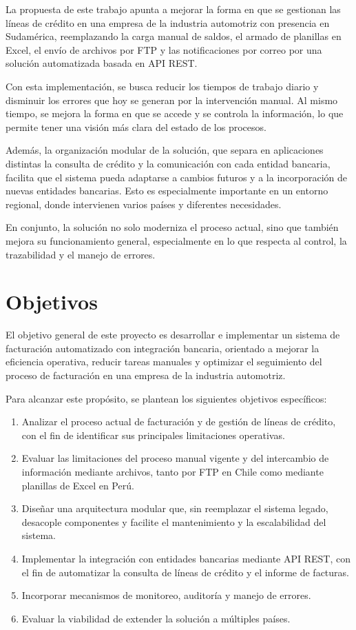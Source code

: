 La propuesta de este trabajo apunta a mejorar la forma en que se gestionan las líneas de crédito en una empresa de la industria automotriz con presencia en Sudamérica, reemplazando la carga manual de saldos, el armado de planillas en Excel, el envío de archivos por FTP y las notificaciones por correo por una solución automatizada basada en API REST.

Con esta implementación, se busca reducir los tiempos de trabajo diario y disminuir los errores que hoy se generan por la intervención manual. Al mismo tiempo, se mejora la forma en que se accede y se controla la información, lo que permite tener una visión más clara del estado de los procesos.

Además, la organización modular de la solución, que separa en aplicaciones distintas la consulta de crédito y la comunicación con cada entidad bancaria, facilita que el sistema pueda adaptarse a cambios futuros y a la incorporación de nuevas entidades bancarias. Esto es especialmente importante en un entorno regional, donde intervienen varios países y diferentes necesidades.

En conjunto, la solución no solo moderniza el proceso actual, sino que también mejora su funcionamiento general, especialmente en lo que respecta al control, la trazabilidad y el manejo de errores.

\section{Objetivos}

El objetivo general de este proyecto es desarrollar e implementar un sistema de facturación automatizado con integración bancaria, orientado a mejorar la eficiencia operativa, reducir tareas manuales y optimizar el seguimiento del proceso de facturación en una empresa de la industria automotriz.

Para alcanzar este propósito, se plantean los siguientes objetivos específicos:

\begin{enumerate}
\def\labelenumi{\arabic{enumi}.}
\item
  Analizar el proceso actual de facturación y de gestión de líneas de crédito, con el fin de identificar sus principales limitaciones operativas.
\item
  Evaluar las limitaciones del proceso manual vigente y del intercambio de información mediante archivos, tanto por FTP en Chile como mediante planillas de Excel en Perú.
\item
  Diseñar una arquitectura modular que, sin reemplazar el sistema legado, desacople componentes y facilite el mantenimiento y la escalabilidad del sistema.
\item
  Implementar la integración con entidades bancarias mediante API REST, con el fin de automatizar la consulta de líneas de crédito y el informe de facturas.
\item
  Incorporar mecanismos de monitoreo, auditoría y manejo de errores.
\item
  Evaluar la viabilidad de extender la solución a múltiples países.
\end{enumerate}

